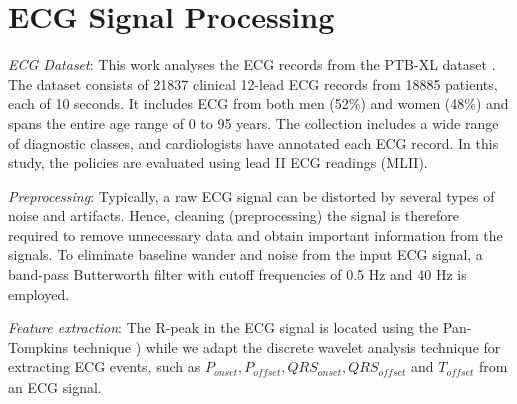 \section{ECG Signal Processing}


\textit{ECG Dataset}: This work analyses the ECG records from the PTB-XL dataset \cite{wagner2020ptb}. The dataset consists of 21837 clinical 12-lead ECG records from 18885 patients, each of 10 seconds. It includes ECG from both men (52\%) and women (48\%) and spans the entire age range of 0 to 95 years. The collection includes a wide range of diagnostic classes, and cardiologists have annotated each ECG record. In this study, the policies are evaluated using lead II ECG readings (MLII).


\textit{Preprocessing}: Typically, a raw ECG signal can be distorted by several types of noise and artifacts. Hence, cleaning (preprocessing) the signal is therefore required to remove unnecessary data and obtain important information from the signals. To eliminate baseline wander and noise from the input ECG signal, a band-pass Butterworth filter with cutoff frequencies of 0.5 Hz and 40 Hz is employed.

\textit{Feature extraction}: 
The R-peak in the ECG signal is located using the Pan-Tompkins technique \cite{pan1985real}) while we adapt the discrete wavelet analysis technique for extracting ECG events, such as $ \mathit{P_{onset}}, \mathit{P_{offset}}, \mathit{QRS_{onset}}, \mathit{QRS_{offset}}$ and $\mathit{T_{offset}} $ from an ECG signal.